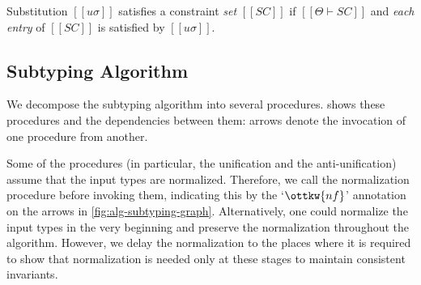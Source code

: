 Substitution $[[uσ]]$ satisfies a constraint \emph{set} $[[SC]]$
if $[[Θ ⊢ SC]]$ and \emph{each entry} of $[[SC]]$ is satisfied by $[[uσ]]$.

\subsection{Subtyping Algorithm}
\label{sec:subtyping-algorithm}
  
  We decompose the subtyping algorithm 
  into several procedures. 
  shows these procedures and the dependencies between them:
  arrows denote the invocation of one procedure from another.

  Some of the procedures (in particular, the unification and the
  anti-unification) assume that the input types are normalized. Therefore, we
  call the normalization procedure before invoking them, indicating this by the
  `$\ottkw{nf}$' annotation on the arrows in \cref{fig:alg-subtyping-graph}.
  Alternatively, one could normalize the input types in the very beginning
  and preserve the normalization throughout the algorithm. However, we
  delay the normalization to the places where it is required to show that
  normalization is needed only at these stages to maintain consistent
  invariants.

